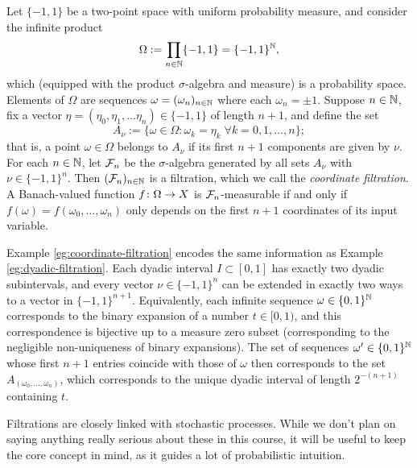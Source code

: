 \begin{example}\label{eg:coordinate-filtration}
  Let $\{-1,1\}$ be a two-point space with uniform probability measure, and consider the infinite product
  \begin{equation*}
    \Omega := \prod_{n \in \mathbb{N}} \{-1,1\} = \{-1,1\}^{\mathbb{N}},
  \end{equation*}
  which (equipped with the product $\sigma$-algebra and measure) is a probability space.
  Elements of $\Omega$ are sequences $\omega = (\omega_n)_{n \in \mathbb{N}}$ where each $\omega_n = \pm 1$.
  Suppose $n \in \mathbb{N}$, fix a vector $\eta = (\eta_0, \eta_1, \ldots \eta_n) \in \{-1,1\}$ of length $n+1$, and define the set
  \begin{equation*}
    A_{\nu} := \{\omega \in \Omega : \omega_k = \eta_k \; \forall k = 0,1,\ldots,n\};
  \end{equation*}
  that is, a point $\omega \in \Omega$ belongs to $A_{\nu}$ if its first $n+1$ components are given by $\nu$.
  For each $n \in \mathbb{N}$, let $\mathcal{F}_n$ be the $\sigma$-algebra generated by all sets $A_{\nu}$ with $\nu \in \{-1,1\}^n$.
  Then $(\mathcal{F}_n)_{n \in \mathbb{N}}$ is a filtration, which we call the \emph{coordinate filtration}.
  A Banach-valued function $f \colon \Omega \rightarrow X$ is $\mathcal{F}_n$-measurable if and only if $f(\omega) = f(\omega_0,\ldots,\omega_n)$ only depends on the first $n+1$ coordinates of its input variable.
\end{example}

\begin{rmk}
  Example \ref{eg:coordinate-filtration} encodes the same information as Example \ref{eg:dyadic-filtration}.
  Each dyadic interval $I \subset [0,1]$ has exactly two dyadic subintervals, and every vector $\nu \in \{-1,1\}^n$ can be extended in exactly two ways to a vector in $\{-1,1\}^{n+1}$.
  Equivalently, each infinite sequence $\omega \in \{0,1\}^{\mathbb{N}}$ corresponds to the binary expansion of a number $t \in [0,1)$, and this correspondence is bijective up to a measure zero subset (corresponding to the negligible non-uniqueness of binary expansions).
  The set of sequences $\omega' \in \{0,1\}^{\mathbb{N}}$ whose first $n+1$ entries coincide with those of $\omega$ then corresponds to the set $A_{(\omega_0,\ldots,\omega_n)}$, which corresponds to the unique dyadic interval of length $2^{-(n+1)}$ containing $t$. 
\end{rmk}

Filtrations are closely linked with stochastic processes.
While we don't plan on saying anything really serious about these in this course, it will be useful to keep the core concept in mind, as it guides a lot of probabilistic intuition.

